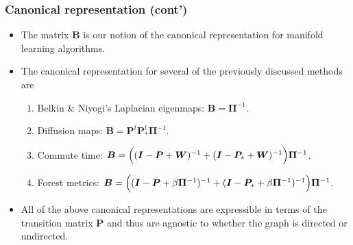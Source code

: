 \documentclass[professionalfonts, hyperref={pdfpagelabels=false,
  colorlinks=true, linkcolor=purple}]{beamer}
\begin{document}
\begin{frame}
  \frametitle{Canonical representation (cont')}
  \begin{itemize}
  \item The matrix $\bm{B}$ is our notion of the canonical
    representation for manifold learning algorithms. 
  \item The canonical representation for several of the previously
    discussed methods are
    \begin{enumerate}
    \item Belkin \& Niyogi's Laplacian eigenmaps: $\bm{B} = \bm{\Pi}^{-1}$.
    \item Diffusion maps: $\bm{B} = \bm{P}^{t} \bm{P}_{*}^{t}
      \bm{\Pi}^{-1}$.
    \item Commute time: $\bm{B} = \Bigl((\bm{I} - \bm{P} +
      \bm{W})^{-1} + (\bm{I} - \bm{P}_{*} + \bm{W})^{-1}\Bigr)
      \bm{\Pi}^{-1}$.
    \item Forest metrics: $\bm{B} = \Bigl((\bm{I} - \bm{P} + \beta
      \bm{\Pi}^{-1})^{-1} + (\bm{I} - \bm{P}_{*} + \beta
      \bm{\Pi}^{-1})^{-1}\Bigr) \bm{\Pi}^{-1}$.
    \end{enumerate}
  \item
    All of the above canonical representations are expressible
    in terms of the transition matrix $\bm{P}$ and thus are agnostic to
    whether the graph is directed or undirected. 
  \end{itemize}
\end{frame}
\end{document}
